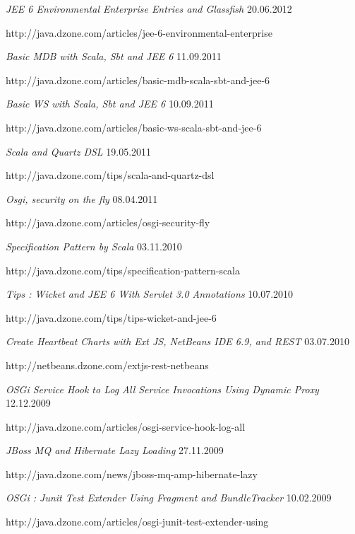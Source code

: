 \documentclass{res}
\begin{document}
\begin{resume}
{\sl JEE 6 Environmental Enterprise Entries and Glassfish}  \hfill    20.06.2012	\\
\item[] http://java.dzone.com/articles/jee-6-environmental-enterprise

{\sl Basic MDB with Scala, Sbt and JEE 6}  \hfill   11.09.2011	\\
\item[] http://java.dzone.com/articles/basic-mdb-scala-sbt-and-jee-6

{\sl Basic WS with Scala, Sbt and JEE 6}  \hfill   10.09.2011	\\
\item[] http://java.dzone.com/articles/basic-ws-scala-sbt-and-jee-6

{\sl Scala and Quartz DSL}  \hfill   19.05.2011	\\
\item[] http://java.dzone.com/tips/scala-and-quartz-dsl

{\sl Osgi, security on the fly}  \hfill    08.04.2011	\\
\item[] http://java.dzone.com/articles/osgi-security-fly

{\sl Specification Pattern by Scala}  \hfill   03.11.2010	\\
\item[] http://java.dzone.com/tips/specification-pattern-scala

{\sl Tips : Wicket and JEE 6 With Servlet 3.0 Annotations}  \hfill  10.07.2010	\\
\item[] http://java.dzone.com/tips/tips-wicket-and-jee-6

{\sl Create Heartbeat Charts with Ext JS, NetBeans IDE 6.9, and REST}  \hfill    03.07.2010	\\
\item[] http://netbeans.dzone.com/extjs-rest-netbeans

{\sl OSGi Service Hook to Log All Service Invocations Using Dynamic Proxy}  \hfill    12.12.2009	\\
\item[] http://java.dzone.com/articles/osgi-service-hook-log-all

{\sl JBoss MQ and Hibernate Lazy Loading}  \hfill    27.11.2009	\\
\item[] http://java.dzone.com/news/jboss-mq-amp-hibernate-lazy

{\sl OSGi : Junit Test Extender Using Fragment and BundleTracker}  \hfill  10.02.2009	\\
\item[] http://java.dzone.com/articles/osgi-junit-test-extender-using


\end{resume}
\end{document}
